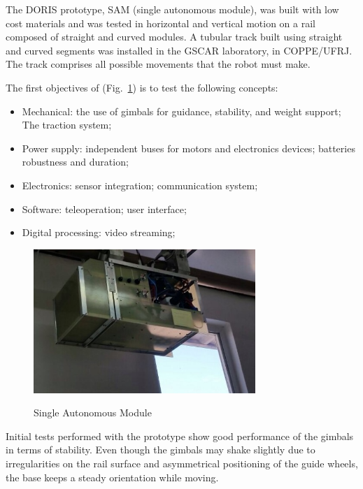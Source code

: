 \documentclass{ifacconf}
\begin{document}
The DORIS prototype, SAM (single autonomous module), was built
with low cost materials and was tested in horizontal and vertical motion on a
rail composed of straight and curved modules. A tubular track built using
straight and curved segments was installed in the GSCAR laboratory, in
COPPE/UFRJ. The track comprises all possible movements that the robot must
make.

The first objectives of (Fig.~\ref{fig:SAM2}) is to test the following concepts:
\begin{itemize}
  \item Mechanical: the use of gimbals for guidance, stability, and weight
  support; The traction system;
  \item Power supply: independent buses for motors and electronics devices;
  batteries robustness and duration;
  \item Electronics: sensor integration; communication system;
  \item Software: teleoperation; user interface;
  \item Digital processing: video streaming;
  \end{itemize} 

\begin{figure}[!h]
\begin{center}
\includegraphics[width=8.4cm]{figs/SAM2.jpg}  %
\label{fig:SAM2}
\caption{Single Autonomous Module}
\end{center}
\end{figure}
 
Initial tests performed with the prototype show good performance of the gimbals
in terms of stability. Even though the gimbals may shake slightly due to
irregularities on the rail surface and asymmetrical positioning of the guide
wheels, the base keeps a steady orientation while moving.
\end{document}
